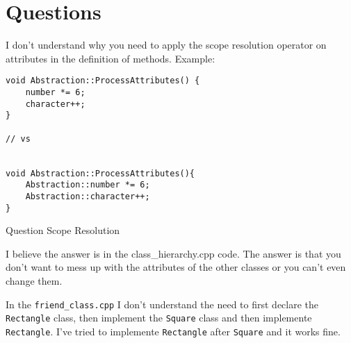 \documentclass[11pt, a4paper]{article}
\begin{document}
\section{Questions}%
\label{sec:questions}


I don't understand why you need to apply the scope resolution operator on attributes in the definition of methods. Example:


\begin{listing}[hbt!]
\begin{verbatim}
void Abstraction::ProcessAttributes() {
    number *= 6;
    character++;
}

// vs


void Abstraction::ProcessAttributes(){
	Abstraction::number *= 6;
	Abstraction::character++;
}
\end{verbatim}
\caption{Question Scope Resolution}
\label{lst:question_scope_resolution}
\end{listing}

I believe the answer is in the class\_hierarchy.cpp code. The answer is that you don't want to mess up with the attributes of the other classes or you can't even change them.





In the \texttt{friend\_class.cpp} I don't understand the need to first declare the \texttt{Rectangle} class, then implement the \texttt{Square} class and then implemente \texttt{Rectangle}. I've tried to implemente \texttt{Rectangle} after \texttt{Square} and it works fine.
\end{document}
